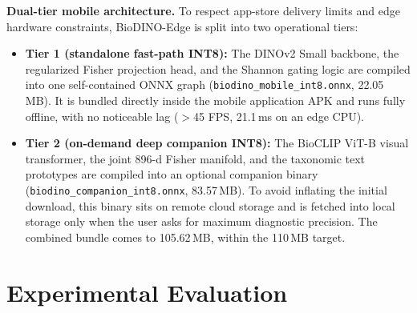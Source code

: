 \documentclass[conference]{IEEEtran}
\begin{document}
\textbf{Dual-tier mobile architecture.} To respect app-store delivery limits and edge hardware constraints, BioDINO-Edge is split into two operational tiers:
\begin{itemize}
    \item \textbf{Tier 1 (standalone fast-path INT8):} The DINOv2 Small backbone, the regularized Fisher projection head, and the Shannon gating logic are compiled into one self-contained ONNX graph (\texttt{biodino\_mobile\_int8.onnx}, 22.05\,MB). It is bundled directly inside the mobile application APK and runs fully offline, with no noticeable lag ($>$45 FPS, 21.1\,ms on an edge CPU).
    \item \textbf{Tier 2 (on-demand deep companion INT8):} The BioCLIP ViT-B visual transformer, the joint 896-d Fisher manifold, and the taxonomic text prototypes are compiled into an optional companion binary (\texttt{biodino\_companion\_int8.onnx}, 83.57\,MB). To avoid inflating the initial download, this binary sits on remote cloud storage and is fetched into local storage only when the user asks for maximum diagnostic precision. The combined bundle comes to 105.62\,MB, within the 110\,MB target.
\end{itemize}

\section{Experimental Evaluation}
\end{document}

